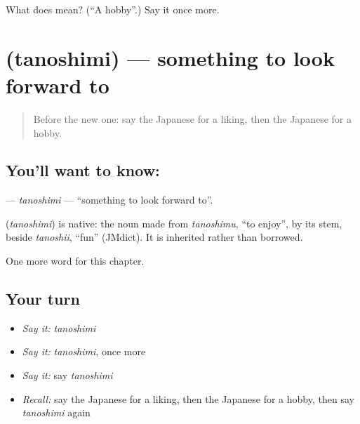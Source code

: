 \begin{tcolorbox}[breakable,colback=teal!4,colframe=teal!35!black,title={Before you move on}]
What does  mean? (\textquotedblleft{}A hobby\textquotedblright{}.) Say it once more.
\end{tcolorbox}
\section[\texorpdfstring{\ja{たのしみ} (tanoshimi)}{たのしみ (tanoshimi)}]{ (tanoshimi) — something to look forward to}

\label{lesson:JA-C94-tanoshimi}



\begin{quote}
Before the new one: say the Japanese for a liking, then the Japanese for a hobby.
\end{quote}

\subsection*{You'll want to know: }
\textbf{} — \emph{tanoshimi} — \textquotedblleft{}something to look forward to\textquotedblright{}.

\begin{cousinweb}
\textbf{} (\emph{tanoshimi}) is native: the noun made from \emph{tanoshimu}, \textquotedblleft{}to enjoy\textquotedblright{}, by its stem, beside \emph{tanoshii}, \textquotedblleft{}fun\textquotedblright{} (JMdict). It is inherited rather than borrowed.
\end{cousinweb}

\begin{grammarlens}[title={What you've built}]
One more word for this chapter.
\end{grammarlens}

\subsection*{Your turn}
\begin{itemize}
\raggedright
  \item \emph{Say it:} \emph{tanoshimi}
  \item \emph{Say it:} \emph{tanoshimi}, once more
  \item \emph{Say it:} say \emph{tanoshimi}
  \item \emph{Recall:} say the Japanese for a liking, then the Japanese for a hobby, then say \emph{tanoshimi} again
\end{itemize}

